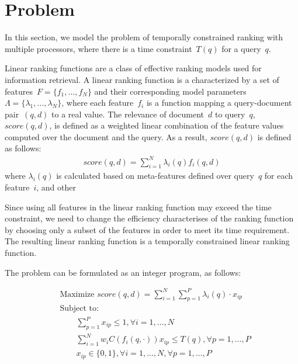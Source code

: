 \documentclass[10pt, conference, compsocconf]{IEEEtran}
\begin{document}
\section{Problem}\label{sec:prob}
In this section, we model the problem of temporally constrained ranking with multiple processors, where there is a time constraint~$T(q)$ for a query~$q$. 

Linear ranking functions are a class of effective ranking models used for information retrieval.
A linear ranking function is a characterized by a set of features~$F=\{f_1,\dotsc,f_N\}$ and their corresponding model parameters~$ \Lambda =\{\lambda_1,\dotsc,\lambda_N\}$, where each feature~$f_i$ is a function mapping a query-document pair~$(q,d)$ to a real value. 
The relevance of document~$d$ to query~$q$, $score(q,d)$, is defined as a weighted linear combination of the feature values computed over the document and the query.
As a result, $score(q,d)$ is defined as follows:
\begin{align}
score(q,d) = \sum_{i= 1}^{N}  \lambda_i(q) f_i(q,d)
\end{align}
where $\lambda_i(q)$ is calculated based on meta-features defined over query~$q$ for each feature~$i$, and other  

Since using all features in the linear ranking function may exceed the time constraint, we need to change the efficiency characterises of the ranking function by choosing
only a subset of the features  in order to meet its time requirement. The resulting linear ranking function is a temporally constrained linear ranking function. 

The problem can  be formulated as 
an integer program, as follows:

\begin{align}
&\text{Maximize } score(q,d) = \sum_{i= 1}^{N} \sum_{p=1}^{P}   \lambda_i(q) \cdot  x_{ip}\label{eq:ipobj}\\ %
&\text{Subject to: } \nonumber \\
&\qquad \sum_{p=1}^{P}x_{ip} \leq 1, \forall i=1, \dotsc, N  \label{eq:ipc2}\\
&\qquad \sum_{i=1}^{N}  w_i C(f_i(q, \cdot))x_{ip} \leq T(q), \forall p=1, \dotsc, P  \label{eq:ipc1} \\
&\qquad x_{ip}\in\{0,1\}, \forall i=1, \dotsc, N, \forall p=1, \dotsc, P \label{eq:ipc4}
\end{align} 
\end{document}
